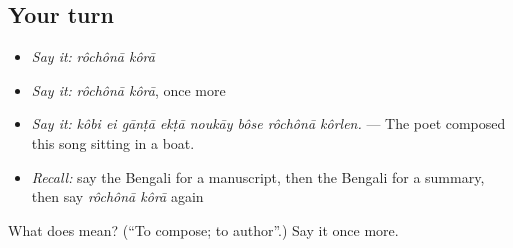 \subsection*{Your turn}
\begin{itemize}
\raggedright
  \item \emph{Say it:} \emph{rôchônā kôrā}
  \item \emph{Say it:} \emph{rôchônā kôrā}, once more
  \item \emph{Say it:} \emph{kôbi ei gānṭā ekṭā noukāy bôse rôchônā kôrlen.} — The poet composed this song sitting in a boat.
  \item \emph{Recall:} say the Bengali for a manuscript, then the Bengali for a summary, then say \emph{rôchônā kôrā} again
\end{itemize}

\begin{tcolorbox}[breakable,colback=teal!4,colframe=teal!35!black,title={Before you move on}]
What does   mean? (\textquotedblleft{}To compose; to author\textquotedblright{}.) Say it once more.
\end{tcolorbox}
